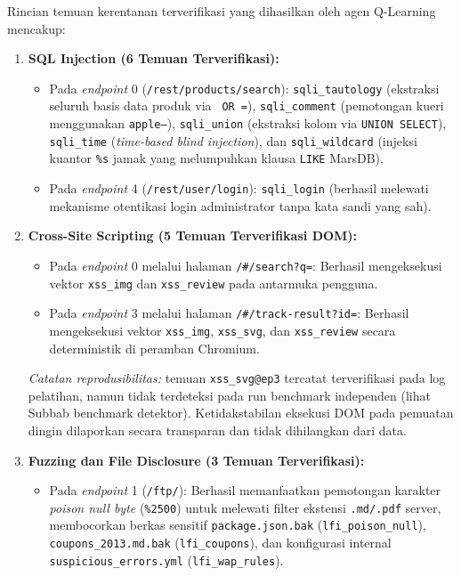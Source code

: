 Rincian temuan kerentanan terverifikasi yang dihasilkan oleh agen Q-Learning mencakup:
\begin{enumerate}
    \item \textbf{SQL Injection (6 Temuan Terverifikasi):}
    \begin{itemize}
        \item Pada \textit{endpoint} 0 (\texttt{/rest/products/search}): \texttt{sqli\_tautology} (ekstraksi seluruh basis data produk via \texttt{\textquotesingle\ OR \textquotesingle =}), \texttt{sqli\_comment} (pemotongan kueri menggunakan \texttt{apple\textquotesingle --}), \texttt{sqli\_union} (ekstraksi kolom via \texttt{UNION SELECT}), \texttt{sqli\_time} (\textit{time-based blind injection}), dan \texttt{sqli\_wildcard} (injeksi kuantor \texttt{\%s} jamak yang melumpuhkan klausa \texttt{LIKE} MarsDB).
        \item Pada \textit{endpoint} 4 (\texttt{/rest/user/login}): \texttt{sqli\_login} (berhasil melewati mekanisme otentikasi login administrator tanpa kata sandi yang sah).
    \end{itemize}
    \item \textbf{Cross-Site Scripting (5 Temuan Terverifikasi DOM):}
    \begin{itemize}
        \item Pada \textit{endpoint} 0 melalui halaman \texttt{/\#/search?q=}: Berhasil mengeksekusi vektor \texttt{xss\_img} dan \texttt{xss\_review} pada antarmuka pengguna.
        \item Pada \textit{endpoint} 3 melalui halaman \texttt{/\#/track-result?id=}: Berhasil mengeksekusi vektor \texttt{xss\_img}, \texttt{xss\_svg}, dan \texttt{xss\_review} secara deterministik di peramban Chromium.
    \end{itemize}
    \textit{Catatan reprodusibilitas:} temuan \texttt{xss\_svg@ep3} tercatat terverifikasi pada log pelatihan, namun tidak terdeteksi pada run benchmark independen (lihat Subbab benchmark detektor). Ketidakstabilan eksekusi DOM pada pemuatan dingin dilaporkan secara transparan dan tidak dihilangkan dari data. 
    \item \textbf{Fuzzing dan File Disclosure (3 Temuan Terverifikasi):}
    \begin{itemize}
        \item Pada \textit{endpoint} 1 (\texttt{/ftp/}): Berhasil memanfaatkan pemotongan karakter \textit{poison null byte} (\texttt{\%2500}) untuk melewati filter ekstensi \texttt{.md/.pdf} server, membocorkan berkas sensitif \texttt{package.json.bak} (\texttt{lfi\_poison\_null}), \texttt{coupons\_2013.md.bak} (\texttt{lfi\_coupons}), dan konfigurasi internal \texttt{suspicious\_errors.yml} (\texttt{lfi\_wap\_rules}).
    \end{itemize}
\end{enumerate}


